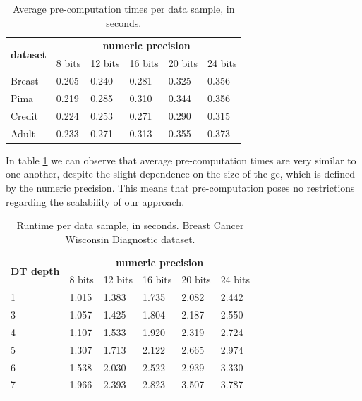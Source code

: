 \begin{table}[H]
\centering
\caption{Average pre-computation times per data sample, in seconds.}
\label{table:avgDTAllDatasets}
\begin{tabular}{|l|l|l|l|l|l|}
\hline
\multicolumn{1}{|c|}{\multirow{2}{*}{\textbf{dataset}}} & \multicolumn{5}{c|}{\textbf{numeric precision}}                                             \\ \cline{2-6} 
\multicolumn{1}{|c|}{}                                  & 8 bits & 12 bits & 16 bits & 20 bits & 24 bits \\ \hline
Breast                                                  & 0.205           & 0.240            & 0.281            & 0.325            & 0.356            \\ \hline
Pima                                                    & 0.219           & 0.285            & 0.310            & 0.344            & 0.356            \\ \hline
Credit                                                  & 0.224           & 0.253            & 0.271            & 0.290            & 0.315            \\ \hline
Adult                                                   & 0.233           & 0.271            & 0.313            & 0.355            & 0.373            \\ \hline
\end{tabular}
\end{table}


In table \ref{table:avgDTAllDatasets} we can observe that average pre-computation times are very similar to one another, despite the slight dependence on the size of the \ac{gc}, which is defined by the numeric precision. This means that pre-computation poses no restrictions regarding the scalability of our approach.

\begin{table}[H]
\centering
\caption{Runtime per data sample, in seconds. Breast Cancer Wisconsin Diagnostic dataset.}
\label{table:runtimeDTBCW}
\begin{tabular}{|l|l|l|l|l|l|}
\hline
\multirow{2}{*}{\textbf{DT depth}} & \multicolumn{5}{c|}{\textbf{numeric precision}}         \\ \cline{2-6} 
                          & 8 bits & 12 bits & 16 bits & 20 bits & 24 bits \\ \hline
1                         & 1.015  & 1.383   & 1.735   & 2.082   & 2.442   \\ \hline
3                         & 1.057  & 1.425   & 1.804   & 2.187   & 2.550   \\ \hline
4                         & 1.107  & 1.533   & 1.920   & 2.319   & 2.724   \\ \hline
5                         & 1.307  & 1.713   & 2.122   & 2.665   & 2.974   \\ \hline
6                         & 1.538  & 2.030   & 2.522   & 2.939   & 3.330   \\ \hline
7                         & 1.966  & 2.393   & 2.823   & 3.507   & 3.787   \\ \hline
\end{tabular}
\end{table}


